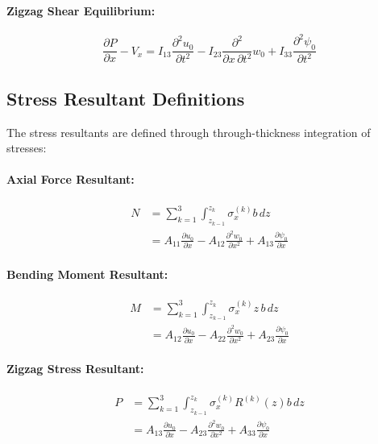 \documentclass[12pt,a4paper]{report}
\begin{document}
\paragraph{Zigzag Shear Equilibrium:}
\begin{equation}
\frac{\partial P}{\partial x} - V_x 
= I_{13} \frac{\partial^2 u_0}{\partial t^2} 
- I_{23} \frac{\partial^2}{\partial x \, \partial t^2} w_0 
+ I_{33} \frac{\partial^2 \psi_0}{\partial t^2}
\end{equation}

\subsection*{Stress Resultant Definitions}

The stress resultants are defined through through-thickness integration of stresses:

\paragraph{Axial Force Resultant:}
\begin{align}
N &= \sum_{k=1}^{3} \int_{z_{k-1}}^{z_k} \sigma_x^{(k)} b \, dz \nonumber \\
  &= A_{11} \frac{\partial u_0}{\partial x} 
   - A_{12} \frac{\partial^2 w_0}{\partial x^2} 
   + A_{13} \frac{\partial \psi_0}{\partial x}
\end{align}

\paragraph{Bending Moment Resultant:}
\begin{align}
M &= \sum_{k=1}^{3} \int_{z_{k-1}}^{z_k} \sigma_x^{(k)} z \, b \, dz \nonumber \\
  &= A_{12} \frac{\partial u_0}{\partial x} 
   - A_{22} \frac{\partial^2 w_0}{\partial x^2} 
   + A_{23} \frac{\partial \psi_0}{\partial x}
\end{align}

\paragraph{Zigzag Stress Resultant:}
\begin{align}
P &= \sum_{k=1}^{3} \int_{z_{k-1}}^{z_k} \sigma_x^{(k)} R^{(k)}(z) b \, dz \nonumber \\
  &= A_{13} \frac{\partial u_0}{\partial x} 
   - A_{23} \frac{\partial^2 w_0}{\partial x^2} 
   + A_{33} \frac{\partial \psi_0}{\partial x}
\end{align}
\end{document}
